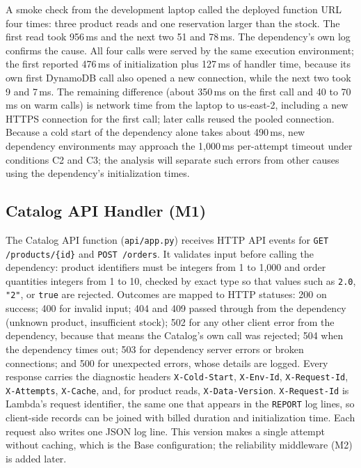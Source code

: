 \documentclass[10pt]{article}
\begin{document}
A smoke check from the development laptop called the deployed function URL
four times: three product reads and one reservation larger than the stock. The
first read took 956\,ms and the next two 51 and 78\,ms. The dependency's own log
confirms the cause. All four calls were served by the same execution
environment; the first reported 476\,ms of initialization plus 127\,ms of handler
time, because its own first DynamoDB call also opened a new connection, while
the next two took 9 and 7\,ms. The remaining difference (about 350\,ms on the
first call and 40 to 70\,ms on warm calls) is network time from the laptop to
us-east-2, including a new HTTPS connection for the first call; later calls
reused the pooled connection. Because a cold start of the dependency alone
takes about 490\,ms, new dependency environments may approach the 1{,}000\,ms
per-attempt timeout under conditions C2 and C3; the analysis will separate such
errors from other causes using the dependency's initialization times.

\subsection{Catalog API Handler (M1)}
The Catalog API function (\texttt{api/app.py}) receives HTTP API events for
\texttt{GET /products/\{id\}} and \texttt{POST /orders}. It validates input
before calling the dependency: product identifiers must be integers from 1 to
1{,}000 and order quantities integers from 1 to 10, checked by exact type so
that values such as \texttt{2.0}, \texttt{"2"}, or \texttt{true} are rejected.
Outcomes are mapped to HTTP statuses: 200 on success; 400 for invalid input;
404 and 409 passed through from the dependency (unknown product, insufficient
stock); 502 for any other client error from the dependency, because that means
the Catalog's own call was rejected; 504 when the dependency times out; 503 for
dependency server errors or broken connections; and 500 for unexpected errors,
whose details are logged. Every response carries the diagnostic headers
\texttt{X-Cold-Start}, \texttt{X-Env-Id}, \texttt{X-Request-Id},
\texttt{X-Attempts}, \texttt{X-Cache}, and, for product reads,
\texttt{X-Data-Version}. \texttt{X-Request-Id} is Lambda's request identifier,
the same one that appears in the \texttt{REPORT} log lines, so client-side
records can be joined with billed duration and initialization time. Each
request also writes one JSON log line. This version makes a single attempt
without caching, which is the Base configuration; the reliability middleware
(M2) is added later.
\end{document}

